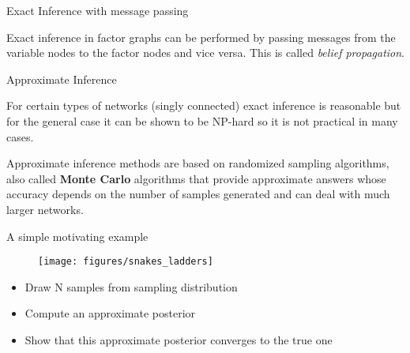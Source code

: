 \documentclass[12pt]{beamer}
\begin{document}
\begin{frame}{Exact Inference with message passing}


  Exact inference in factor graphs can be performed by passing
  messages from the variable nodes to the factor nodes and vice versa.
  This is called {\it belief propagation}. 

  \vspace{0.5cm}
  

  \end{frame} 

\begin{frame}{Approximate Inference}

  For certain types of networks (singly connected) exact inference is
  reasonable but for the general case it can be shown to be NP-hard so
  it is not practical in many cases.

  Approximate inference methods are based on randomized sampling
  algorithms, also called {\bf Monte Carlo} algorithms that provide
  approximate answers whose accuracy depends on the number of samples
  generated and can deal with much larger networks. 
  
\end{frame}

\begin{frame}{A simple motivating example}
\begin{figure}[htb]
   \centering
   \texttt{[image: figures/snakes\_ladders]}
\end{figure}

\begin{itemize}
\item Draw N samples from sampling distribution
\item Compute an approximate posterior
\item Show that this approximate posterior converges to the true one
\end{itemize} 
\end{frame}
\end{document}

